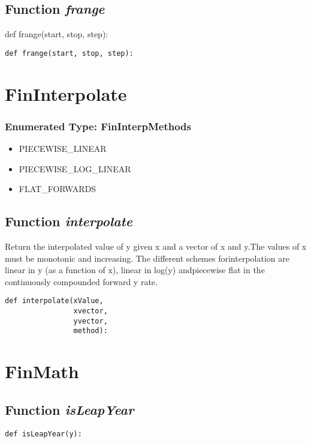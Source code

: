 \documentclass[twoside,11pt]{book}
\begin{document}
\subsection{Function {\it frange}}
def frange(start, stop, step):

\begin{lstlisting}
def frange(start, stop, step):
\end{lstlisting}

\newpage
\section{FinInterpolate}

\subsubsection{Enumerated Type: FinInterpMethods}
\begin{itemize}
\item{PIECEWISE\_LINEAR}
\item{PIECEWISE\_LOG\_LINEAR}
\item{FLAT\_FORWARDS}
\end{itemize}

\subsection{Function {\it interpolate}}
Return the interpolated value of y given x and a vector of x and y.The values of x must be monotonic and increasing. The different schemes forinterpolation are linear in y (as a function of x), linear in log(y) andpiecewise flat in the continuously compounded forward y rate. 

\begin{lstlisting}
def interpolate(xValue,
                xvector,
                yvector,
                method):
\end{lstlisting}

\newpage
\section{FinMath}

\subsection{Function {\it isLeapYear}}


\begin{lstlisting}
def isLeapYear(y):
\end{lstlisting}
\end{document}
